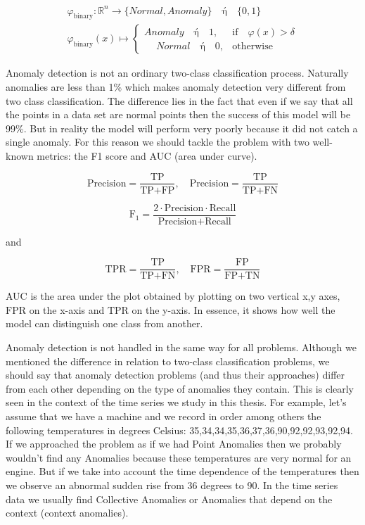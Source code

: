\documentclass[a4paper,12pt]{report}
\theoremstyle{definitionNODot}
\begin{document}
	\begin{align*}
		\varphi_\text{binary} \colon \mathbb{R}^n \rightarrow \{Normal, Anomaly\} \quad \text{ή} \quad \{0,1\} \\
		\varphi_\text{binary}(x) \mapsto \begin{cases}
			Anomaly \quad \text{ή} \quad 1, & \text{if} \quad \varphi(x) > \delta \\
			\phantom{-}Normal \quad \text{ή} \quad 0, & \text{otherwise}
		\end{cases}
	\end{align*}
	
	Anomaly detection is not an ordinary two-class classification process. Naturally anomalies are less than 1\% which makes anomaly detection very different from two class classification. The difference lies in the fact that even if we say that all the points in a data set are normal points then the success of this model will be 99\%. But in reality the model will perform very poorly because it did not catch a single anomaly. For this reason we should tackle the problem with two well-known metrics: the F1 score and AUC (area under curve).
	
	$$ \text{Precision} = \frac{\text{TP}}{\text{TP}+\text{FP}}, \quad \text{Precision} = \frac{\text{TP}}{\text{TP}+\text{FN}} $$
	
	$$ \text{F}_1 = \frac{2 \cdot \text{Precision} \cdot \text{Recall}}{\text{Precision}+\text{Recall}} $$
	
	and
	
	$$ \text{TPR} = \frac{\text{TP}}{\text{TP}+\text{FN}}, \quad \text{FPR} = \frac{\text{FP}}{\text{FP}+\text{TN}} $$
	
	AUC is the area under the plot obtained by plotting on two vertical x,y axes, $ \text{FPR} $ on the x-axis and $ \text{TPR} $ on the y-axis. In essence, it shows how well the model can distinguish one class from another.
	
	Anomaly detection is not handled in the same way for all problems. Although we mentioned the difference in relation to two-class classification problems, we should say that anomaly detection problems (and thus their approaches) differ from each other depending on the type of anomalies they contain. This is clearly seen in the context of the time series we study in this thesis. For example, let's assume that we have a machine and we record in order among others the following temperatures in degrees Celsius: 35,34,34,35,36,37,36,90,92,92,93,92,94. If we approached the problem as if we had Point Anomalies then we probably wouldn't find any Anomalies because these temperatures are very normal for an engine. But if we take into account the time dependence of the temperatures then we observe an abnormal sudden rise from 36 degrees to 90. In the time series data we usually find Collective Anomalies or Anomalies that depend on the context (context anomalies).
	
\end{document}
